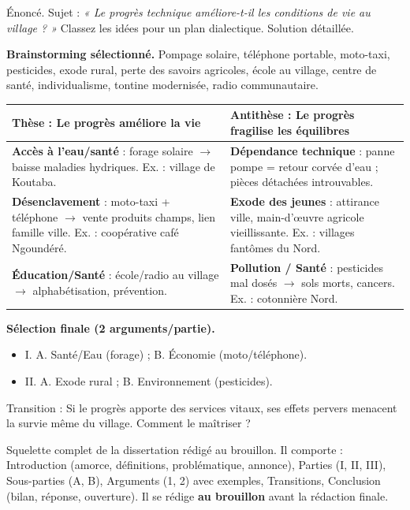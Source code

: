 \documentclass[11pt]{article}
\newcounter{popsec}
\newcounter{popsub}
\newcommand{\courssub}[1]{%
  \stepcounter{popsub}%
  \par\vspace{9pt}\noindent{\popxbold\fontsize{11.5}{13}\selectfont\color{popink}{\color{poporange}\thepopsec.\thepopsub}\hspace{6pt}#1}\par\nopagebreak\vspace{4pt}
}
\begin{document}
\begin{exoresolu}
Énoncé. Sujet : \emph{« Le progrès technique améliore-t-il les conditions de vie au village ? »} Classez les idées pour un plan dialectique.
\tcblower
Solution détaillée.

\textbf{Brainstorming sélectionné.} Pompage solaire, téléphone portable, moto-taxi, pesticides, exode rural, perte des savoirs agricoles, école au village, centre de santé, individualisme, tontine modernisée, radio communautaire.

\begin{center}
\begin{tabularx}{\linewidth}{|>{\columncolor{popblueL}}X|>{\columncolor{poporangeL}}X|}
\hline
\textbf{Thèse : Le progrès améliore la vie} & \textbf{Antithèse : Le progrès fragilise les équilibres} \\
\hline
\textbf{Accès à l'eau/santé} : forage solaire $\rightarrow$ baisse maladies hydriques. Ex. : village de Koutaba. & \textbf{Dépendance technique} : panne pompe = retour corvée d'eau ; pièces détachées introuvables. \\
\hline
\textbf{Désenclavement} : moto-taxi + téléphone $\rightarrow$ vente produits champs, lien famille ville. Ex. : coopérative café Ngoundéré. & \textbf{Exode des jeunes} : attirance ville, main-d'œuvre agricole vieillissante. Ex. : villages fantômes du Nord. \\
\hline
\textbf{Éducation/Santé} : école/radio au village $\rightarrow$ alphabétisation, prévention. & \textbf{Pollution / Santé} : pesticides mal dosés $\rightarrow$ sols morts, cancers. Ex. : cotonnière Nord. \\
\hline
\end{tabularx}
\end{center}

\textbf{Sélection finale (2 arguments/partie).}
\begin{itemize}
\item I. A. Santé/Eau (forage) ; B. Économie (moto/téléphone).
\item II. A. Exode rural ; B. Environnement (pesticides).
\end{itemize}
Transition : \og Si le progrès apporte des services vitaux, ses effets pervers menacent la survie même du village. Comment le maîtriser ? \fg
\end{exoresolu}

\courssub{Élaborer le plan détaillé}

\begin{definition}
Squelette complet de la dissertation rédigé au brouillon. Il comporte : Introduction (amorce, définitions, problématique, annonce), Parties (I, II, III), Sous-parties (A, B), Arguments (1, 2) avec exemples, Transitions, Conclusion (bilan, réponse, ouverture). Il se rédige \textbf{au brouillon} avant la rédaction finale.
\end{definition}
\end{document}
